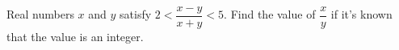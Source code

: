 Real numbers $x$ and $y$ satisfy $2<\dfrac{x-y}{x+y}<5$. Find the value of $\dfrac{x}{y}$ if it's known that the value is an integer.
